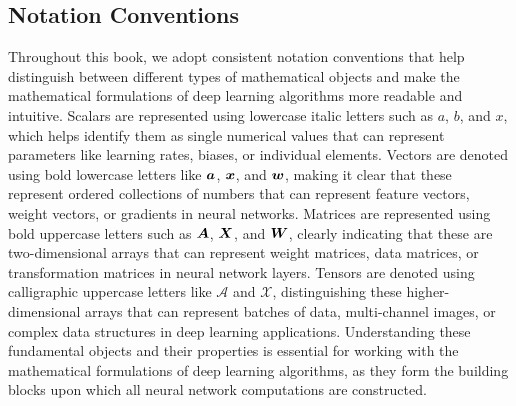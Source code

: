 \subsection{Notation Conventions}

Throughout this book, we adopt consistent notation conventions that help distinguish between different types of mathematical objects and make the mathematical formulations of deep learning algorithms more readable and intuitive. Scalars are represented using lowercase italic letters such as $a$, $b$, and $x$, which helps identify them as single numerical values that can represent parameters like learning rates, biases, or individual elements. Vectors are denoted using bold lowercase letters like $\boldsymbol{a}$, $\boldsymbol{x}$, and $\boldsymbol{w}$, making it clear that these represent ordered collections of numbers that can represent feature vectors, weight vectors, or gradients in neural networks. Matrices are represented using bold uppercase letters such as $\boldsymbol{A}$, $\boldsymbol{X}$, and $\boldsymbol{W}$, clearly indicating that these are two-dimensional arrays that can represent weight matrices, data matrices, or transformation matrices in neural network layers. Tensors are denoted using calligraphic uppercase letters like $\mathcal{A}$ and $\mathcal{X}$, distinguishing these higher-dimensional arrays that can represent batches of data, multi-channel images, or complex data structures in deep learning applications. Understanding these fundamental objects and their properties is essential for working with the mathematical formulations of deep learning algorithms, as they form the building blocks upon which all neural network computations are constructed.
